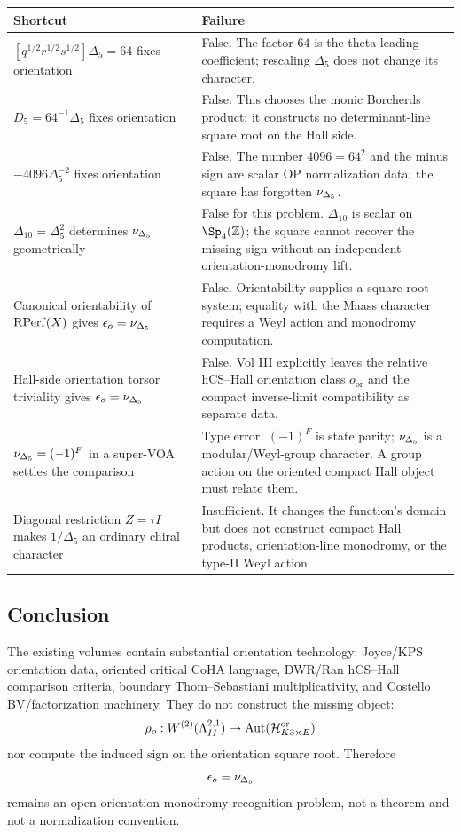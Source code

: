 \begin{center}
\small
\begin{tabular}{p{}p{}}
\hline
Shortcut & Failure \\
\hline
\([q^{1/2}r^{1/2}s^{1/2}]\Delta_5=64\) fixes orientation &
False.  The factor \(64\) is the theta-leading coefficient; rescaling
\(\Delta_5\) does not change its character. \\
\(D_5=64^{-1}\Delta_5\) fixes orientation &
False.  This chooses the monic Borcherds product; it constructs no
determinant-line square root on the Hall side. \\
\(-4096\Delta_5^{-2}\) fixes orientation &
False.  The number \(4096=64^2\) and the minus sign are scalar OP
normalization data; the square has forgotten \(\nu_{\Delta_5}\). \\
\(\Delta_{10}=\Delta_5^2\) determines \(\nu_{\Delta_5}\) geometrically &
False for this problem.  \(\Delta_{10}\) is scalar on \(\Sp_4(\Z)\);
the square cannot recover the missing sign without an independent
orientation-monodromy lift. \\
Canonical orientability of \(\operatorname{RPerf}(X)\) gives \(\epsilon_o=\nu_{\Delta_5}\) &
False.  Orientability supplies a square-root system; equality with the
Maass character requires a Weyl action and monodromy computation. \\
Hall-side orientation torsor triviality gives \(\epsilon_o=\nu_{\Delta_5}\) &
False.  Vol III explicitly leaves the relative hCS--Hall orientation
class \(o_{\mathrm{or}}\) and the compact inverse-limit compatibility as
separate data. \\
\(\nu_{\Delta_5}=(-1)^F\) in a super-VOA settles the comparison &
Type error.  \((-1)^F\) is state parity; \(\nu_{\Delta_5}\) is a
modular/Weyl-group character.  A group action on the oriented compact
Hall object must relate them. \\
Diagonal restriction \(Z=\tau I\) makes \(1/\Delta_5\) an ordinary
chiral character &
Insufficient.  It changes the function's domain but does not construct
compact Hall products, orientation-line monodromy, or the type-II Weyl
action. \\
\hline
\end{tabular}
\end{center}

\subsection{Conclusion}

The existing volumes contain substantial orientation technology:
Joyce/KPS orientation data, oriented critical CoHA language,
DWR/Ran hCS--Hall comparison criteria, boundary Thom--Sebastiani
multiplicativity, and Costello BV/factorization machinery.  They do not
construct the missing object:
\[
\rho_o:W^{(2)}(\Lambda^{2,1}_{II})
\to\operatorname{Aut}(\mathcal H^{\mathrm{or}}_{K3\times E})
\]
nor compute the induced sign on the orientation square root.  Therefore
\[
\epsilon_o=\nu_{\Delta_5}
\]
remains an open orientation-monodromy recognition problem, not a theorem
and not a normalization convention.

